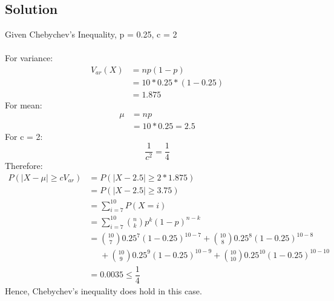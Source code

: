 \documentclass[12pt]{article}
\begin{document}
\subsection{Solution}
Given Chebychev's Inequality, p = 0.25, c = 2\\\\
For variance:
\begin{equation}
    \begin{aligned}
        V_{ar}(X)&=np(1-p)\\
        &=10*0.25*(1-0.25)\\
        &=1.875
    \end{aligned}
\end{equation}
For mean:
\begin{equation}
    \begin{aligned}
        \mu&=np\\
        &=10*0.25=2.5
    \end{aligned}
\end{equation}
For c = 2:
\begin{equation}
    \dfrac{1}{c^2}=\dfrac{1}{4}
\end{equation}
Therefore:
\begin{equation}
    \begin{aligned}
        P(|X-\mu|\geq cV_{ar})&=P(|X-2.5|\geq 2*1.875)\\
        &=P(|X-2.5|\geq 3.75)\\
        &=\sum\limits_{i=7}^{10}P(X=i)\\
        &=\sum\limits_{i=7}^{10}\binom{n}{k}p^k(1-p)^{n-k}\\
        &=\binom{10}{7}0.25^7(1-0.25)^{10-7}+\binom{10}{8}0.25^8(1-0.25)^{10-8}\\
        &\ \ \ \ \ \ +\binom{10}{9}0.25^9(1-0.25)^{10-9}+\binom{10}{10}0.25^{10}(1-0.25)^{10-10}\\
        &=0.0035\leq\dfrac{1}{4}
    \end{aligned}
\end{equation}
Hence, Chebychev's inequality does hold in this case.
\end{document}
